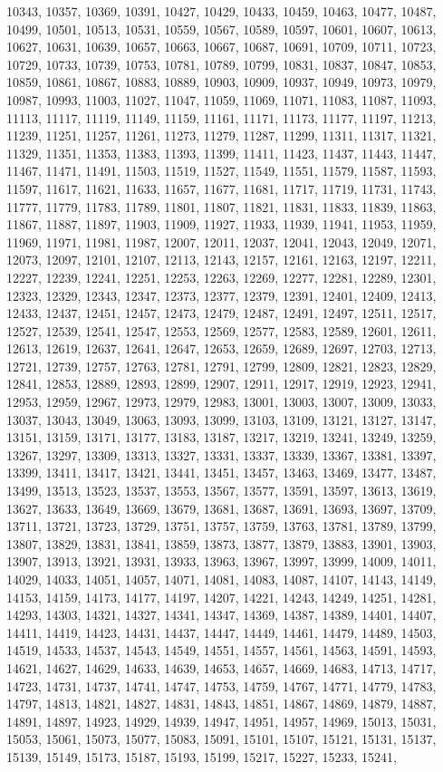 \documentclass[10pt,twocolumn]{article}
\begin{document}
\begin{thebibliography}{9}
10343, 10357, 10369, 10391, 10427, 10429, 10433, 10459, 10463, 10477, 10487, 10499, 10501, 10513, 10531, 10559, 10567, 10589, 10597, 10601, 10607, 10613, 10627, 10631, 10639, 10657, 10663, 10667, 10687, 10691, 10709, 10711, 10723, 10729, 10733, 10739, 10753, 10781, 10789, 10799, 10831, 10837, 10847, 10853, 10859, 10861, 10867, 10883, 10889, 10903, 10909, 10937, 10949, 10973, 10979, 10987, 10993, 11003, 11027, 11047, 11059, 11069, 11071, 11083, 11087, 11093, 11113, 11117, 11119, 11149, 11159, 11161, 11171, 11173, 11177, 11197, 11213, 11239, 11251, 11257, 11261, 11273, 11279, 11287, 11299, 11311, 11317, 11321, 11329, 11351, 11353, 11383, 11393, 11399, 11411, 11423, 11437, 11443, 11447, 11467, 11471, 11491, 11503, 11519, 11527, 11549, 11551, 11579, 11587, 11593, 11597, 11617, 11621, 11633, 11657, 11677, 11681, 11717, 11719, 11731, 11743, 11777, 11779, 11783, 11789, 11801, 11807, 11821, 11831, 11833, 11839, 11863, 11867, 11887, 11897, 11903, 11909, 11927, 11933, 11939, 11941, 11953, 11959, 11969, 11971, 11981, 11987, 12007, 12011, 12037, 12041, 12043, 12049, 12071, 12073, 12097, 12101, 12107, 12113, 12143, 12157, 12161, 12163, 12197, 12211, 12227, 12239, 12241, 12251, 12253, 12263, 12269, 12277, 12281, 12289, 12301, 12323, 12329, 12343, 12347, 12373, 12377, 12379, 12391, 12401, 12409, 12413, 12433, 12437, 12451, 12457, 12473, 12479, 12487, 12491, 12497, 12511, 12517, 12527, 12539, 12541, 12547, 12553, 12569, 12577, 12583, 12589, 12601, 12611, 12613, 12619, 12637, 12641, 12647, 12653, 12659, 12689, 12697, 12703, 12713, 12721, 12739, 12757, 12763, 12781, 12791, 12799, 12809, 12821, 12823, 12829, 12841, 12853, 12889, 12893, 12899, 12907, 12911, 12917, 12919, 12923, 12941, 12953, 12959, 12967, 12973, 12979, 12983, 13001, 13003, 13007, 13009, 13033, 13037, 13043, 13049, 13063, 13093, 13099, 13103, 13109, 13121, 13127, 13147, 13151, 13159, 13171, 13177, 13183, 13187, 13217, 13219, 13241, 13249, 13259, 13267, 13297, 13309, 13313, 13327, 13331, 13337, 13339, 13367, 13381, 13397, 13399, 13411, 13417, 13421, 13441, 13451, 13457, 13463, 13469, 13477, 13487, 13499, 13513, 13523, 13537, 13553, 13567, 13577, 13591, 13597, 13613, 13619, 13627, 13633, 13649, 13669, 13679, 13681, 13687, 13691, 13693, 13697, 13709, 13711, 13721, 13723, 13729, 13751, 13757, 13759, 13763, 13781, 13789, 13799, 13807, 13829, 13831, 13841, 13859, 13873, 13877, 13879, 13883, 13901, 13903, 13907, 13913, 13921, 13931, 13933, 13963, 13967, 13997, 13999, 14009, 14011, 14029, 14033, 14051, 14057, 14071, 14081, 14083, 14087, 14107, 14143, 14149, 14153, 14159, 14173, 14177, 14197, 14207, 14221, 14243, 14249, 14251, 14281, 14293, 14303, 14321, 14327, 14341, 14347, 14369, 14387, 14389, 14401, 14407, 14411, 14419, 14423, 14431, 14437, 14447, 14449, 14461, 14479, 14489, 14503, 14519, 14533, 14537, 14543, 14549, 14551, 14557, 14561, 14563, 14591, 14593, 14621, 14627, 14629, 14633, 14639, 14653, 14657, 14669, 14683, 14713, 14717, 14723, 14731, 14737, 14741, 14747, 14753, 14759, 14767, 14771, 14779, 14783, 14797, 14813, 14821, 14827, 14831, 14843, 14851, 14867, 14869, 14879, 14887, 14891, 14897, 14923, 14929, 14939, 14947, 14951, 14957, 14969, 15013, 15031, 15053, 15061, 15073, 15077, 15083, 15091, 15101, 15107, 15121, 15131, 15137, 15139, 15149, 15173, 15187, 15193, 15199, 15217, 15227, 15233, 15241, 
\end{thebibliography}
\end{document}
